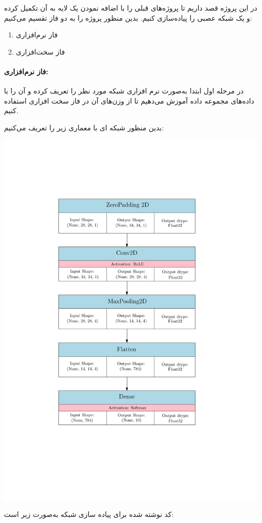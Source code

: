 \begin{qsolve}
	در این پروژه قصد داریم تا پروژه‌های قبلی را با اضافه نمودن یک لایه  به آن تکمیل کرده و یک شبکه عصبی  را پیاده‌سازی کنیم. بدین منظور پروژه را به دو فاز تقسیم می‌کنیم:
	\begin{enumerate}
		\item فاز نرم‌افزاری
		\item فاز سخت‌افزاری
	\end{enumerate}
	
	\paragraph{فاز نرم‌افزاری:}
	
	در مرحله اول ابتدا به‌صورت نرم افزاری شبکه مورد نظر را تعریف کرده و آن را با داده‌های مجموعه داده  آموزش می‌دهیم تا از وزن‌های آن در فاز سخت افزاری استفاده کنیم.
	
	بدین منظور شبکه ای با معماری زیر را تعریف می‌کنیم:
	
	\begin{center}
		\includegraphics*[width=0.6\linewidth]{pics/img2.pdf}
		\label{معماری شبکه مورد نظر}
	\end{center}

	کد نوشته شده برای پیاده سازی شبکه به‌صورت زیر است:
\end{qsolve}

